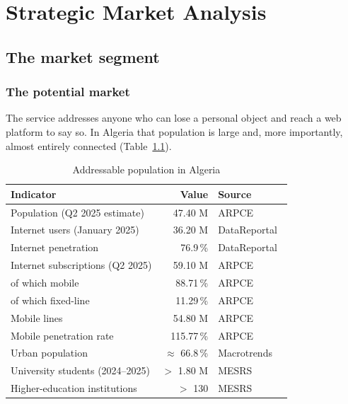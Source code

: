 \chapter{Strategic Market Analysis}
\label{ch:market}

\section{The market segment}

\subsection{The potential market}

The service addresses anyone who can lose a personal object and reach a web
platform to say so. In Algeria that population is large and, more importantly,
almost entirely connected (Table~\ref{tab:market-size}).

\begin{table}[htbp]
\centering
\caption{Addressable population in Algeria}
\label{tab:market-size}
\small
\begin{tabularx}{\textwidth}{@{}X r l@{}}
\toprule
\textbf{Indicator} & \textbf{Value} & \textbf{Source} \\
\midrule
Population (Q2 2025 estimate)            & 47.40 M  & ARPCE~\cite{arpce2025} \\
Internet users (January 2025)            & 36.20 M  & DataReportal~\cite{datareportal2025} \\
Internet penetration                     & 76.9\,\% & DataReportal~\cite{datareportal2025} \\
Internet subscriptions (Q2 2025)         & 59.10 M  & ARPCE~\cite{arpce2025} \\
\quad of which mobile                    & 88.71\,\% & ARPCE~\cite{arpce2025} \\
\quad of which fixed-line                & 11.29\,\% & ARPCE~\cite{arpce2025} \\
Mobile lines                             & 54.80 M  & ARPCE~\cite{arpce2025} \\
Mobile penetration rate                  & 115.77\,\% & ARPCE~\cite{arpce2025} \\
Urban population                         & $\approx$ 66.8\,\% & Macrotrends~\cite{macrotrends2025} \\
University students (2024--2025)         & $>$ 1.80 M & MESRS~\cite{mesrs2025} \\
Higher-education institutions            & $>$ 130   & MESRS~\cite{mesrs2025} \\
\bottomrule
\end{tabularx}
\end{table}

